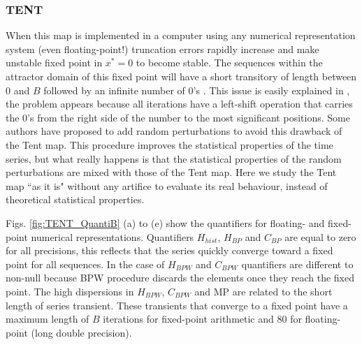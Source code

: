 \subsubsection{TENT} \label{sssec:tent}

When this map is implemented in a computer using any numerical representation system (even floating-point!) truncation errors rapidly increase and make unstable fixed point in $x^*=0$ to become stable.
The sequences within the attractor domain of this fixed point will have a short transitory of length between $0$ and $B$ followed by an infinite number of $0$'s \cite{Jessa2002,Callegari}.
This issue is easily explained in \cite{Li2004}, the problem appears because all iterations have a left-shift operation that carries the $0$'s from the right side of the number to the most significant positions.
Some authors \cite{buscar} have proposed to add random perturbations to avoid this drawback of the Tent map.
This procedure improves the statistical properties of the time series, but what really happens is that the statistical properties of the random perturbations are mixed with those of the Tent map.
Here we study the Tent map ``as it is" without any artifice to evaluate its real behaviour, instead of theoretical statistical properties. 

Figs. \ref{fig:TENT_QuantiB} (a) to (e) show the quantifiers for floating- and fixed-point numerical representations.
Quantifiers $H_{hist}$, $H_{BP}$ and $C_{BP}$ are equal to zero for all precisions, this reflects that the series quickly converge toward a fixed point for all sequences.
In the case of $H_{BPW}$ and $C_{BPW}$ quantifiers are different to non-null because BPW procedure discards the elements once they reach the fixed point.
The high dispersions in $H_{BPW}$, $C_{BPW}$ and MP are related to the short length of series transient.
These transients that converge to a fixed point have a maximum length of $B$ iterations for fixed-point arithmetic and $80$ for floating-point (long double precision).

